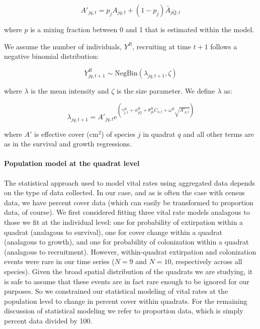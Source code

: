 \documentclass[12pt,]{article}
\begin{document}
\begin{equation}
A'_{jq,t} = p_{j}A_{jq,t} + (1-p_{j})\bar{A}_{jQ,t}
\end{equation}

where $p$ is a mixing fraction between 0 and 1 that is estimated within
the model.

We assume the number of individuals, $Y^{R}$, recruiting at time $t+1$
follows a negative binomial distribution:

\begin{equation}
Y^{R}_{jq,t+1} \sim \text{NegBin}(\lambda_{jq,t+1},\zeta)
\end{equation}

where $\lambda$ is the mean intensity and $\zeta$ is the size parameter.
We define $\lambda$ as:

\begin{equation}
\lambda_{jq,t+1} = A'_{jq,t}e^{(\gamma^{R}_{j,t} + \phi^{R}_{jQ} + \theta^{R}_{jk}C_{k,t} + \omega^{R}\sqrt{A'_{q,t}})}
\end{equation}

where $A'$ is effective cover ($\text{cm}^2$) of species $j$ in quadrat
$q$ and all other terms are as in the survival and growth regressions.

\paragraph{Population model at the quadrat
level}\label{population-model-at-the-quadrat-level}

The statistical approach used to model vital rates using aggregated data
depends on the type of data collected. In our case, and as is often the
case with census data, we have percent cover data (which can easily be
transformed to proportion data, of course). We first considered fitting
three vital rate models analagous to those we fit at the individual
level: one for probability of extirpation within a quadrat (analagous to
survival), one for cover change within a quadrat (analagous to growth),
and one for probability of colonization within a quadrat (analagous to
recruitment). However, within-quadrat extirpation and colonization
events were rare in our time series ($N=9$ and $N=10$, respectively
across all species). Given the broad spatial distribution of the
quadrats we are studying, it is safe to assume that these events are in
fact rare enough to be ignored for our purposes. So we constrained our
statistical modeling of vital rates at the population level to change in
percent cover within quadrats. For the remaining discussion of
statistical modeling we refer to proportion data, which is simply
percent data divided by 100.
\end{document}
